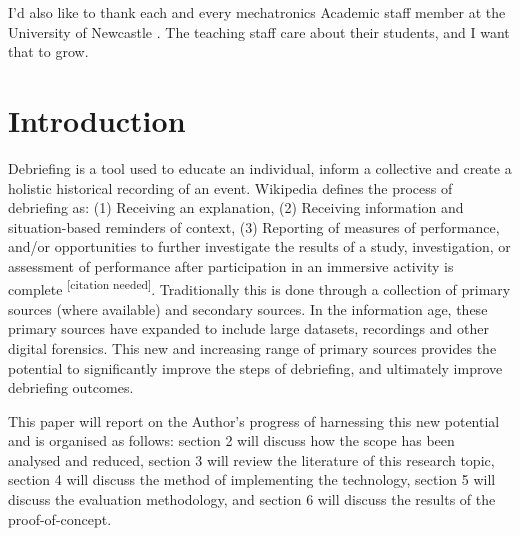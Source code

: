 \documentclass{UoNMCHA}
\newcommand{\citationneeded}{\textsuperscript{\color{blue} [citation needed]}}
\numberwithin{equation}{section}
\begin{document}
I'd also like to thank each and every mechatronics Academic staff member at the University of Newcastle . The teaching staff care about their students, and I want that to grow.
\newpage
\tableofcontents
\newpage
\section{Introduction}
Debriefing is a tool used to educate an individual, inform a collective and create a holistic historical recording of an event. Wikipedia defines the process of debriefing as: (1) Receiving an explanation, (2) Receiving information and situation-based reminders of context, (3) Reporting of measures of performance, and/or opportunities to further investigate the results of a study, investigation, or assessment of performance after participation in an immersive activity is complete\citationneeded. Traditionally this is done through a collection of primary sources (where available) and secondary sources. In the information age, these primary sources have expanded to include large datasets, recordings and other digital forensics. This new and increasing range of primary sources provides the potential to significantly improve the steps of debriefing, and ultimately improve debriefing outcomes.

This paper will report on the Author’s progress of harnessing this new potential and is organised as follows: section 2 will discuss how the scope has been analysed and reduced, section 3 will review the literature of this research topic, section 4 will discuss the method of implementing the technology, section 5 will discuss the evaluation methodology, and section 6 will discuss the results of the proof-of-concept.

%
\end{document}
